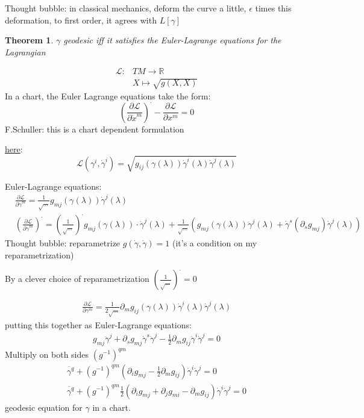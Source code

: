 \documentclass[10pt]{amsart}
\newtheorem{theorem}{Theorem}
\begin{document}
\begin{multicols*}{2}
	Thought bubble: in classical mechanics, deform the curve a little, $\epsilon$ times this deformation, to first order, it agrees with $L[\gamma]$
	
	\begin{theorem}
		$\gamma$ geodesic iff it satisfies the Euler-Lagrange equations for the Lagrangian
	\end{theorem}
	
	\[
	\begin{aligned}
	\mathcal{L}:& TM \to \mathbb{R} \\
	& X \mapsto \sqrt{g(X,X)} \end{aligned}
	\]
	In a chart, the Euler Lagrange equations take the form:
	\[
	\left( \frac{ \partial \mathcal{L}}{  \partial \dot{x}^m } \right)^{\cdot} - \frac{ \partial \mathcal{L}}{ \partial x^m} = 0 
	\]
	F.Schuller: this is a chart dependent formulation
	
	\underline{here}: 
	\[
	\mathcal{L}(\gamma^i , \dot{\gamma}^i ) = \sqrt{ g_{ij}(\gamma(\lambda)) \dot{\gamma}^i(\lambda) \dot{\gamma}^j(\lambda)}
	\]
	
	Euler-Lagrange equations:
	\[
	\begin{aligned}
	& \frac{ \partial \mathcal{L}}{ \partial \dot{\gamma}^m } = \frac{1}{ \sqrt{  \dots } } g_{mj}(\gamma(\lambda)) \dot{\gamma}^j(\lambda) \\ 
	& \left( \frac{ \partial \mathcal{L}}{ \partial \dot{\gamma}^m } \right)^{\cdot} = \left( \frac{1}{ \sqrt{ \dots } } \right)^{\cdot} g_{mj}(\gamma(\lambda)) \cdot \dot{\gamma}^j(\lambda) + \frac{1}{\sqrt{ \dots }} \left( g_{mj}(\gamma(\lambda)) \ddot{\gamma}^j(\lambda) + \dot{\gamma}^s(\partial_s g_{mj}) \dot{\gamma}^j(\lambda) \right)
	\end{aligned}
	\]
	Thought bubble: reparametrize $g(\dot{\gamma}, \dot{\gamma})=1$ (it's a condition on my reparametrization)
	
	By a clever choice of reparametrization $( \frac{1}{\sqrt{ \dots }} )^{\cdot} =0$
	
	\[
	\begin{gathered}
	\frac{ \partial \mathcal{L}}{ \partial \gamma^m} = \frac{1}{ 2\sqrt{ \dots }} \partial_m g_{ij}(\gamma(\lambda)) \dot{\gamma}^i(\lambda) \dot{\gamma}^j(\lambda)
	\end{gathered}
	\]
	putting this together as Euler-Lagrange equations:
	\[
	\begin{gathered}
	g_{mj} \ddot{\gamma}^j +   \partial_s g_{mj} \dot{\gamma}^s \dot{\gamma}^j - \frac{1}{2} \partial_m g_{ij} \dot{\gamma}^i \dot{\gamma}^j = 0 
	\end{gathered}
	\]
	Multiply on both sides $(g^{-1})^{qm}$
	\[
	\begin{gathered}
	\ddot{\gamma^q} + (g^{-1})^{qm}(\partial_i g_{mj} - \frac{1}{2} \partial_m g_{ij} ) \dot{\gamma}^i \dot{\gamma}^j = 0  \\ 
	\boxed{ \ddot{\gamma^q} + (g^{-1})^{qm}\frac{1}{2} (\partial_i g_{mj} + \partial_j g_{mi} -  \partial_m g_{ij} ) \dot{\gamma}^i \dot{\gamma}^j = 0 }
	\end{gathered}
	\]
	geodesic equation for $\gamma$ in a chart.  
	

\end{multicols*}
\end{document}
